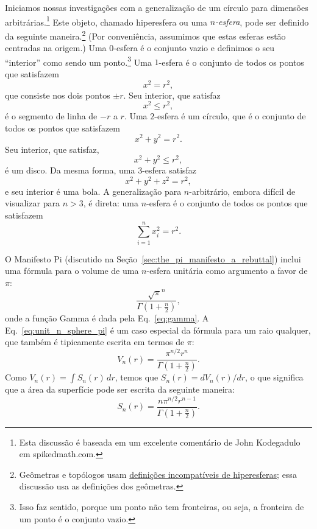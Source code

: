 Iniciamos nossas investigações com a generalização de um círculo para dimensões arbitrárias.\footnote{Esta discussão é baseada em um excelente comentário de John Kodegadulo em spikedmath.com.} Este objeto, chamado hiperesfera ou uma \emph{$n$-esfera}, pode ser definido da seguinte maneira.\footnote{Geômetras e topólogos usam \href{https://mathworld.wolfram.com/Hypersphere.html}{definições incompatíveis de hiperesferas}; essa discussão usa as definições dos geômetras.} (Por conveniência, assumimos que estas esferas estão centradas na origem.) Uma $0$-esfera é o conjunto vazio e definimos o seu ``interior'' como sendo um ponto.\footnote{Isso faz sentido, porque um ponto não tem fronteiras, ou seja, a fronteira de um ponto é o conjunto vazio.} Uma $1$-esfera é o conjunto de todos os pontos que satisfazem
\[
x^2 = r^2,
\]
que consiste nos dois pontos $\pm r$. Seu interior, que satisfaz
\[
x^2 \leq r^2,
\]
é o segmento de linha de $-r$ a $r$. Uma $2$-esfera é um círculo, que é o conjunto de todos os pontos que satisfazem
\[
x^2 + y^2 = r^2.
\]
Seu interior, que satisfaz,
\[
x^2 + y^2 \leq r^2,
\]
é um disco. Da mesma forma, uma $3$-esfera satisfaz
\[
x^2 + y^2 + z^2 = r^2,
\]
e seu interior é uma bola. A generalização para $n$-arbitrário, embora difícil de visualizar para $n > 3$, é direta: uma $n$-esfera é o conjunto de todos os pontos que satisfazem
\[
\sum_{i=1}^{n} x_i^2 = r^2.
\]

O Manifesto Pi (discutido na Seção~\ref{sec:the_pi_manifesto_a_rebuttal}) inclui uma fórmula para o volume de uma $n$-esfera unitária como argumento a favor de $\pi$:
\begin{equation}
\label{eq:unit_n_sphere_pi}
\frac{\sqrt{\pi}^{n} }{\Gamma(1 + \frac{n}{2})},
\end{equation}
onde a função Gamma é dada pela Eq.~\eqref{eq:gamma}. A Eq.~\eqref{eq:unit_n_sphere_pi} é um caso especial da fórmula para um raio qualquer, que também é tipicamente escrita em termos de $\pi$:
\begin{equation}
\label{eq:n_sphere_pi}
V_n(r) = \frac{\pi^{n/2} r^n}{\Gamma(1 + \frac{n}{2})}.
\end{equation}
Como $V_n(r) = \int S_n(r)\,dr$, temos que $S_n(r) = dV_n(r)/dr$, o que significa que a área da superfície pode ser escrita da seguinte maneira:
\begin{equation}
\label{eq:n_sphere_pi_r}
S_n(r) = \frac{n \pi^{n/2} r^{n-1}}{\Gamma(1 + \frac{n}{2})}.
\end{equation}

